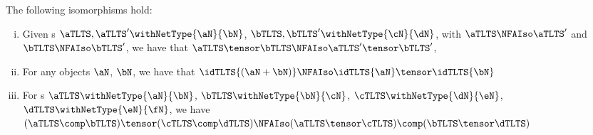 \begin{proposition}\label{prop:TLTSMonCatProps} The following isomorphisms hold:
    \begin{enumerate}[(i)]
        \item \label{tensor-item1} Given \TLTS{}s $\aTLTS, \aTLTS'
            \withNetType{\aN}{\bN}$, $\bTLTS, \bTLTS' \withNetType{\cN}{\dN}$,
            with $\aTLTS \NFAIso \aTLTS'$ and $\bTLTS \NFAIso \bTLTS'$, we have
            that $\aTLTS \tensor \bTLTS \NFAIso \aTLTS' \tensor \bTLTS'$,
        \item \label{tensor-item2} For any objects $\aN$, $\bN$, we have that
            $\idTLTS{(\aN + \bN)} \NFAIso \idTLTS{\aN} \tensor
            \idTLTS{\bN}$
        \item \label{tensor-item3} For \TLTS{}s $\aTLTS
            \withNetType{\aN}{\bN}$, $\bTLTS \withNetType{\bN}{\cN}$, $\cTLTS
            \withNetType{\dN}{\eN}$, $\dTLTS \withNetType{\eN}{\fN}$, we have\\
            $(\aTLTS \comp \bTLTS) \tensor (\cTLTS \comp \dTLTS) \NFAIso
            (\aTLTS \tensor \cTLTS) \comp (\bTLTS \tensor \dTLTS)$
    \end{enumerate}
\end{proposition}
